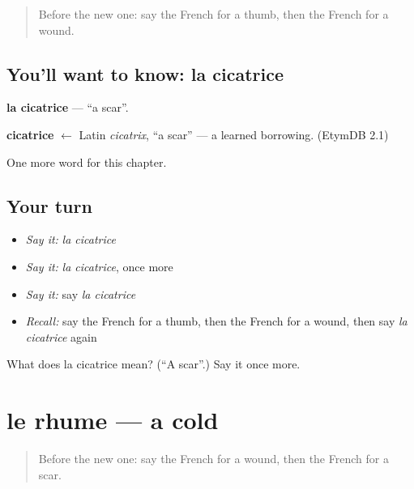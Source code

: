 \label{lesson:FR-C185-cicatrice}



\begin{quote}
Before the new one: say the French for a thumb, then the French for a wound.
\end{quote}

\subsection*{You'll want to know: la cicatrice}
\textbf{la cicatrice} — \textquotedblleft{}a scar\textquotedblright{}.

\begin{cousinweb}
\textbf{cicatrice} $\leftarrow$ Latin \emph{cicatrix}, \textquotedblleft{}a scar\textquotedblright{} — a learned borrowing. (EtymDB 2.1)
\end{cousinweb}

\begin{grammarlens}[title={What you've built}]
One more word for this chapter.
\end{grammarlens}

\subsection*{Your turn}
\begin{itemize}
\raggedright
  \item \emph{Say it:} \emph{la cicatrice}
  \item \emph{Say it:} \emph{la cicatrice}, once more
  \item \emph{Say it:} say \emph{la cicatrice}
  \item \emph{Recall:} say the French for a thumb, then the French for a wound, then say \emph{la cicatrice} again
\end{itemize}

\begin{tcolorbox}[breakable,colback=teal!4,colframe=teal!35!black,title={Before you move on}]
What does la cicatrice mean? (\textquotedblleft{}A scar\textquotedblright{}.) Say it once more.
\end{tcolorbox}
\section[le rhume]{le rhume — a cold}

\label{lesson:FR-C185-rhume}



\begin{quote}
Before the new one: say the French for a wound, then the French for a scar.
\end{quote}

